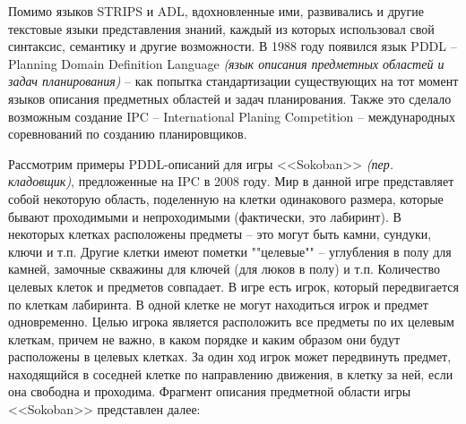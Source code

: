 \documentclass[a4paper,14pt]{extreport}
\begin{document}
    Помимо	языков STRIPS и ADL, вдохновленные ими, развивались и другие текстовые языки представления знаний, каждый из которых использовал свой синтаксис, семантику и другие возможности. В 1988 году появился язык PDDL\cite{pddl3} -- Planning Domain Definition Language \textit{(язык описания предметных областей и задач планирования)} -- как попытка стандартизации существующих на тот момент языков описания предметных областей и задач планирования. Также это сделало возможным создание IPC -- International Planing Competition -- международных соревнований по созданию планировщиков.  
    
    Рассмотрим примеры PDDL-описаний для игры <<Sokoban>> \textit{(пер. кладовщик)}, предложенные на IPC в 2008 году. Мир в данной игре представляет собой некоторую область, поделенную на клетки одинакового размера, которые бывают проходимыми и непроходимыми (фактически, это лабиринт). В некоторых клетках расположены предметы -- это могут быть камни, сундуки, ключи и т.п. Другие клетки имеют пометки ""целевые"" -- углубления в полу для камней, замочные скважины для ключей (для люков в полу) и т.п. Количество целевых клеток и предметов совпадает. В игре есть игрок, который передвигается по клеткам лабиринта. В одной клетке не могут находиться игрок и предмет одновременно. Целью игрока является расположить все предметы по их целевым клеткам, причем не важно, в каком порядке и каким образом они будут расположены в целевых клетках. За один ход игрок может передвинуть предмет, находящийся в соседней клетке по направлению движения, в клетку за ней, если она свободна и проходима. Фрагмент описания предметной области игры <<Sokoban>> представлен далее: 
\end{document}
